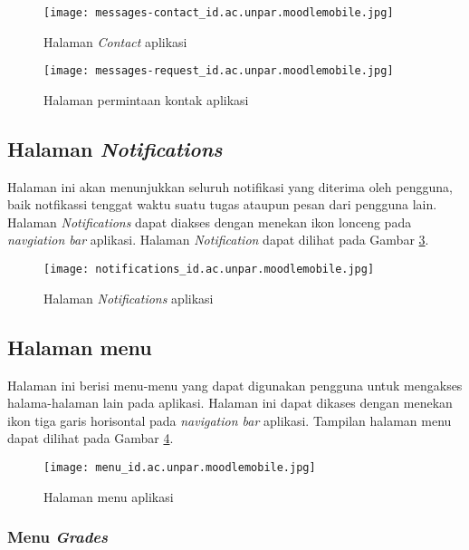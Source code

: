\begin{figure}[H] 
	\centering  
	\texttt{[image: messages-contact\_id.ac.unpar.moodlemobile.jpg]}  
	\caption[Halaman \textit{Contact} aplikasi] {Halaman \textit{Contact} aplikasi} 
	\label{app:messages:contact} 
\end{figure}  


\begin{figure}[H] 
	\centering  
	\texttt{[image: messages-request\_id.ac.unpar.moodlemobile.jpg]}  
	\caption[Halaman permintaan kontak aplikasi] {Halaman permintaan kontak aplikasi} 
	\label{app:messages:request} 
\end{figure}  

\subsection{Halaman \textit{Notifications}}

Halaman ini akan menunjukkan seluruh notifikasi yang diterima oleh pengguna, baik notfikassi tenggat waktu suatu tugas ataupun pesan dari pengguna lain. Halaman \textit{Notifications} dapat diakses dengan menekan ikon lonceng pada \textit{navgiation bar} aplikasi. Halaman \textit{Notification} dapat dilihat pada Gambar \ref{app:notifications}.


\begin{figure}[H] 
	\centering  
	\texttt{[image: notifications\_id.ac.unpar.moodlemobile.jpg]}  
	\caption[Halaman \textit{Notifications} aplikasi] {Halaman \textit{Notifications} aplikasi} 
	\label{app:notifications} 
\end{figure}  

\subsection{Halaman menu}

Halaman ini berisi menu-menu yang dapat digunakan pengguna untuk mengakses halama-halaman lain pada aplikasi. Halaman ini dapat dikases dengan menekan ikon tiga garis horisontal pada \textit{navigation bar} aplikasi. Tampilan halaman menu dapat dilihat pada Gambar \ref{app:menu}.

\begin{figure}[H] 
	\centering  
	\texttt{[image: menu\_id.ac.unpar.moodlemobile.jpg]}  
	\caption[Halaman menu aplikasi] {Halaman menu aplikasi} 
	\label{app:menu} 
\end{figure}  

\subsubsection{Menu \textit{Grades}}

